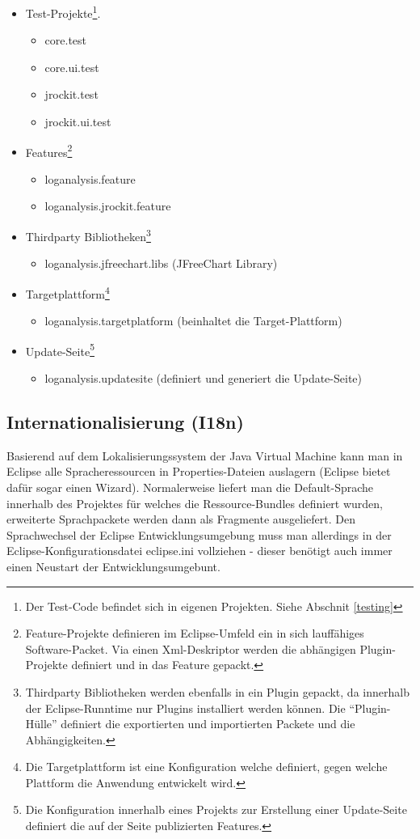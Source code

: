 \begin{itemize}
	\item Test-Projekte\footnote{Der Test-Code befindet sich in eigenen Projekten. Siehe Abschnit \ref{testing} }.
		\begin{itemize}
			\item core.test
			\item core.ui.test
			\item jrockit.test
			\item jrockit.ui.test
		\end{itemize}
	\item  Features\footnote{Feature-Projekte definieren im Eclipse-Umfeld ein in sich lauffähiges Software-Packet. Via einen Xml-Deskriptor werden die abhängigen Plugin-Projekte definiert und in das Feature gepackt.}
		\begin{itemize}
			\item loganalysis.feature
			\item loganalysis.jrockit.feature
		\end{itemize}
	\item  Thirdparty Bibliotheken\footnote{Thirdparty Bibliotheken werden ebenfalls in ein Plugin gepackt, da innerhalb der Eclipse-Runntime nur Plugins installiert werden können. Die ``Plugin-Hülle'' definiert die exportierten und importierten Packete und die Abhängigkeiten.}
		\begin{itemize}
			\item  loganalysis.jfreechart.libs (JFreeChart Library)
		\end{itemize}
	\item  Targetplattform\footnote{Die Targetplattform ist eine Konfiguration welche definiert, gegen welche Plattform die Anwendung entwickelt wird.}
		\begin{itemize}
			\item  loganalysis.targetplatform (beinhaltet die Target-Plattform)
		\end{itemize}
	\item  Update-Seite\footnote{Die Konfiguration innerhalb eines Projekts zur Erstellung einer Update-Seite definiert die auf der Seite publizierten Features.}
		\begin{itemize}
			\item loganalysis.updatesite (definiert und generiert die Update-Seite)
		\end{itemize}
\end{itemize}

\subsection{Internationalisierung (I18n)}
Basierend auf dem Lokalisierungssystem der Java Virtual Machine kann man in Eclipse alle Spracheressourcen in Properties-Dateien auslagern (Eclipse bietet dafür sogar einen Wizard). Normalerweise liefert man die Default-Sprache innerhalb des Projektes für welches die Ressource-Bundles definiert wurden, erweiterte Sprachpackete werden dann als Fragmente ausgeliefert. Den Sprachwechsel der Eclipse Entwicklungsumgebung muss man allerdings in der Eclipse-Konfigurationsdatei eclipse.ini vollziehen - dieser benötigt auch immer einen Neustart der Entwicklungsumgebunt.

